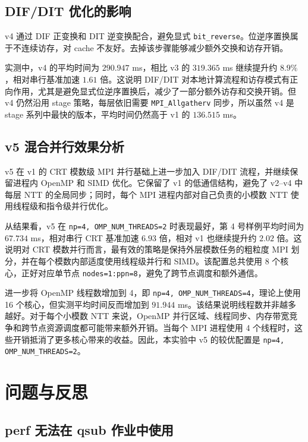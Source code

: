 \documentclass[a4paper]{article}
\begin{document}
\subsection{DIF/DIT 优化的影响}

v4 通过 DIF 正变换和 DIT 逆变换配合，避免显式 \texttt{bit\_reverse}。位逆序置换属于不连续访存，对 cache 不友好。去掉该步骤能够减少额外交换和访存开销。

实测中，v4 的平均时间为 $290.947$ ms，相比 v3 的 $319.365$ ms 继续提升约 $8.9\%$，相对串行基准加速 $1.61$ 倍。这说明 DIF/DIT 对本地计算流程和访存模式有正向作用，尤其是避免显式位逆序置换后，减少了一部分额外访存和交换开销。但 v4 仍然沿用 stage 策略，每层依旧需要 \texttt{MPI\_Allgatherv} 同步，所以虽然 v4 是 stage 系列中最快的版本，平均时间仍然高于 v1 的 $136.515$ ms。

\subsection{v5 混合并行效果分析}

v5 在 v1 的 CRT 模数级 MPI 并行基础上进一步加入 DIF/DIT 流程，并继续保留进程内 OpenMP 和 SIMD 优化。它保留了 v1 的低通信结构，避免了 v2--v4 中每层 NTT 的全局同步；同时，每个 MPI 进程内部对自己负责的小模数 NTT 使用线程级和指令级并行优化。

从结果看，v5 在 \texttt{np=4, OMP\_NUM\_THREADS=2} 时表现最好，第 4 号样例平均时间为 $67.734$ ms，相对串行 CRT 基准加速 $6.93$ 倍，相对 v1 也继续提升约 $2.02$ 倍。这说明对 CRT 模数并行而言，最有效的策略是保持外层模数任务的粗粒度 MPI 划分，并在每个模数内部适度使用线程级并行和 SIMD。该配置总共使用 8 个核心，正好对应单节点 \texttt{nodes=1:ppn=8}，避免了跨节点调度和额外通信。

进一步将 OpenMP 线程数增加到 4，即 \texttt{np=4, OMP\_NUM\_THREADS=4}，理论上使用 16 个核心，但实测平均时间反而增加到 $91.944$ ms。该结果说明线程数并非越多越好。对于每个小模数 NTT 来说，OpenMP 并行区域、线程同步、内存带宽竞争和跨节点资源调度都可能带来额外开销。当每个 MPI 进程使用 4 个线程时，这些开销抵消了更多核心带来的收益。因此，本实验中 v5 的较优配置是 \texttt{np=4, OMP\_NUM\_THREADS=2}。

\section{问题与反思}

\subsection{perf 无法在 qsub 作业中使用}
\end{document}
